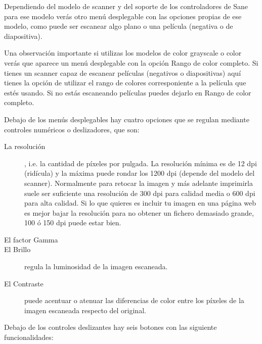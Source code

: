 Dependiendo del modelo  de scanner y del soporte  de los controladores
de Sane para  ese modelo verás otro menú desplegable  con las opciones
propias  de ese  modelo,  como puede  ser escanear  algo  plano o  una
película (negativa o de diapositiva).

Una  observación importante  si  utilizas los  modelos  de color  {\sf
grayscale} o {\sf color} verás que  aparece un menú desplegable con la
opción {\sf  Rango de color completo}.  Si tienes un scanner  capaz de
escanear películas (negativos o diapositivas) aquí tienes la opción de
utilizar el  rango de colores  corresponiente a la película  que estés
usando. Si no estás escaneando  películas puedes dejarlo en {\sf Rango
de color completo}.

Debajo de  los menús desplegables  hay cuatro opciones que  se regulan
mediante controles numéricos o deslizadores, que son:

\begin{description}

\item[La  resolución], i.e.  la cantidad  de píxeles  por pulgada.  La
resolución mínima es de 12 dpi (ridícula) y la máxima puede rondar los
1200 dpi (depende del modelo del scanner). Normalmente para retocar la
imagen y más  adelante imprimirla suele ser  suficiente una resolución
de 300 dpi para  calidad media o 600 dpi para alta  calidad. Si lo que
quieres  es incluir  tu imagen  en una  página web  es mejor  bajar la
resolución para no obtener un fichero  demasiado grande, 100 ó 150 dpi
puede estar bien.

\item[El factor Gamma]

\item[El Brillo] regula la luminosidad de la imagen escaneada.

\item[El Contraste] puede acentuar o  atenuar las diferencias de color
entre los píxeles de la imagen escaneada respecto del original.

\end{description}

Debajo de los controles deslizantes hay seis botones con las siguiente
funcionalidades:

